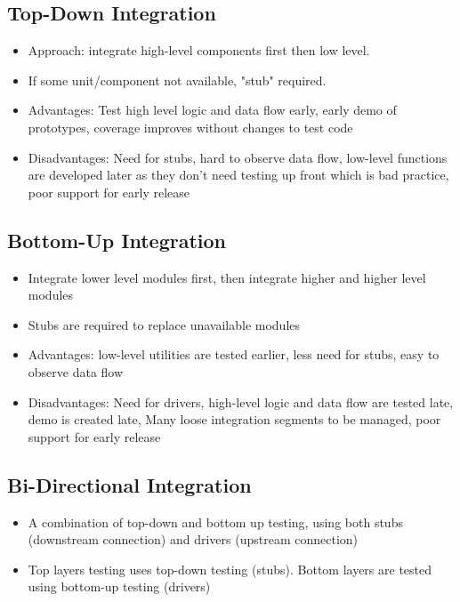 \documentclass{article}
\begin{document}
\subsection{Top-Down Integration}
\begin{itemize}
    \item Approach: integrate high-level components first then low level.
    
    \item If some unit/component not available, "stub" required. 
    
    \item Advantages: Test high level logic and data flow early, early demo of prototypes, coverage improves without changes to test code
    
    \item Disadvantages: Need for stubs, hard to observe data flow, low-level functions are developed later as they don't need testing up front which is bad practice, poor support for early release
\end{itemize}

\subsection{Bottom-Up Integration}
\begin{itemize}
    \item Integrate lower level modules first, then integrate higher and higher level modules
    
    \item Stubs are required to replace unavailable modules
    
    \item Advantages: low-level utilities are tested earlier, less need for stubs, easy to observe data flow
    
    \item Disadvantages: Need for drivers, high-level logic and data flow are tested late, demo is created late, Many loose integration segments to be managed, poor support for early release
\end{itemize}

\subsection{Bi-Directional Integration}
\begin{itemize}
    \item A combination of top-down and bottom up testing, using both stubs (downstream connection) and drivers (upstream connection)
    
    \item Top layers testing uses top-down testing (stubs). Bottom layers are tested using bottom-up testing (drivers)
\end{itemize}
\end{document}
